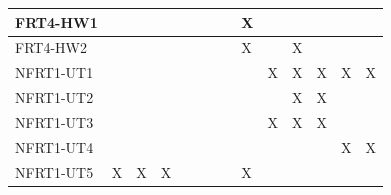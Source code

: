 \documentclass[12pt, titlepage]{article}
\begin{document}
\begin{table}[ht]
{\begin{tabular}{llllllllllllll}
\multicolumn{1}{|l|}{FRT4-HW1}   & \multicolumn{1}{l|}{}  & \multicolumn{1}{l|}{}  & \multicolumn{1}{l|}{}  & \multicolumn{1}{l|}{}  & \multicolumn{1}{l|}{}  & \multicolumn{1}{l|}{}  & \multicolumn{1}{l|}{}  & \multicolumn{1}{l|}{X}  & \multicolumn{1}{l|}{}  & \multicolumn{1}{l|}{}   & \multicolumn{1}{l|}{}  & \multicolumn{1}{l|}{}   & \multicolumn{1}{l|}{}   \\ \hline
\multicolumn{1}{|l|}{FRT4-HW2}   & \multicolumn{1}{l|}{}  & \multicolumn{1}{l|}{}  & \multicolumn{1}{l|}{}  & \multicolumn{1}{l|}{}  & \multicolumn{1}{l|}{}  & \multicolumn{1}{l|}{}  & \multicolumn{1}{l|}{}  & \multicolumn{1}{l|}{X}  & \multicolumn{1}{l|}{}  & \multicolumn{1}{l|}{X}   & \multicolumn{1}{l|}{}  & \multicolumn{1}{l|}{}   & \multicolumn{1}{l|}{}   \\ \hline
\multicolumn{1}{|l|}{NFRT1-UT1}   & \multicolumn{1}{l|}{}  & \multicolumn{1}{l|}{}  & \multicolumn{1}{l|}{}  & \multicolumn{1}{l|}{}  & \multicolumn{1}{l|}{}  & \multicolumn{1}{l|}{}  & \multicolumn{1}{l|}{}  & \multicolumn{1}{l|}{}  & \multicolumn{1}{l|}{X}  & \multicolumn{1}{l|}{X}   & \multicolumn{1}{l|}{X}  & \multicolumn{1}{l|}{X}   & \multicolumn{1}{l|}{X}   \\ \hline
\multicolumn{1}{|l|}{NFRT1-UT2}   & \multicolumn{1}{l|}{}  & \multicolumn{1}{l|}{}  & \multicolumn{1}{l|}{}  & \multicolumn{1}{l|}{}  & \multicolumn{1}{l|}{}  & \multicolumn{1}{l|}{}  & \multicolumn{1}{l|}{}  & \multicolumn{1}{l|}{}  & \multicolumn{1}{l|}{}  & \multicolumn{1}{l|}{X}   & \multicolumn{1}{l|}{X}  & \multicolumn{1}{l|}{}   & \multicolumn{1}{l|}{}   \\ \hline
\multicolumn{1}{|l|}{NFRT1-UT3}   & \multicolumn{1}{l|}{}  & \multicolumn{1}{l|}{}  & \multicolumn{1}{l|}{}  & \multicolumn{1}{l|}{}  & \multicolumn{1}{l|}{}  & \multicolumn{1}{l|}{}  & \multicolumn{1}{l|}{}  & \multicolumn{1}{l|}{}  & \multicolumn{1}{l|}{X}  & \multicolumn{1}{l|}{X}   & \multicolumn{1}{l|}{X}  & \multicolumn{1}{l|}{}   & \multicolumn{1}{l|}{}   \\ \hline
\multicolumn{1}{|l|}{NFRT1-UT4}   & \multicolumn{1}{l|}{}  & \multicolumn{1}{l|}{}  & \multicolumn{1}{l|}{}  & \multicolumn{1}{l|}{}  & \multicolumn{1}{l|}{}  & \multicolumn{1}{l|}{}  & \multicolumn{1}{l|}{}  & \multicolumn{1}{l|}{}  & \multicolumn{1}{l|}{}  & \multicolumn{1}{l|}{}   & \multicolumn{1}{l|}{}  & \multicolumn{1}{l|}{X}   & \multicolumn{1}{l|}{X}   \\ \hline
\multicolumn{1}{|l|}{NFRT1-UT5}   & \multicolumn{1}{l|}{X}  & \multicolumn{1}{l|}{X}  & \multicolumn{1}{l|}{X}  & \multicolumn{1}{l|}{}  & \multicolumn{1}{l|}{}  & \multicolumn{1}{l|}{}  & \multicolumn{1}{l|}{}  & \multicolumn{1}{l|}{X}  & \multicolumn{1}{l|}{}  & \multicolumn{1}{l|}{}   & \multicolumn{1}{l|}{}  & \multicolumn{1}{l|}{}   & \multicolumn{1}{l|}{}   \\ \hline

\end{tabular}}
\end{table}
\end{document}
